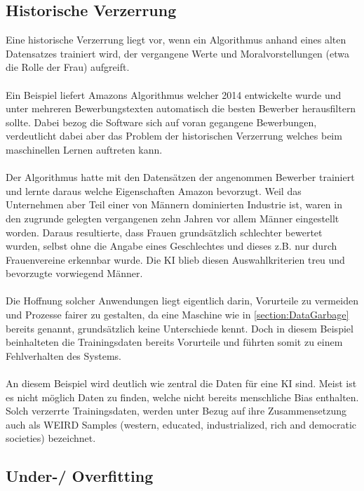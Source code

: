 \documentclass[12pt,oneside,a4paper,parskip]{scrbook}
\begin{document}
\subsection{Historische Verzerrung}
\label{section:biasInTest}
Eine historische Verzerrung liegt vor, wenn ein Algorithmus anhand eines alten Datensatzes trainiert wird, der vergangene Werte und Moralvorstellungen (etwa die Rolle der Frau) aufgreift.%
\\\\
Ein Beispiel liefert Amazons Algorithmus welcher 2014 entwickelte wurde und unter mehreren Bewerbungstexten automatisch die besten Bewerber herausfiltern sollte. Dabei bezog die Software sich auf voran gegangene Bewerbungen, verdeutlicht dabei aber das Problem der historischen Verzerrung welches beim maschinellen Lernen auftreten kann.
\\\\
Der Algorithmus hatte mit den Datensätzen der angenommen Bewerber trainiert und lernte daraus welche Eigenschaften Amazon bevorzugt. Weil das Unternehmen aber Teil einer von Männern dominierten Industrie ist, waren in den zugrunde gelegten vergangenen zehn Jahren vor allem Männer eingestellt worden. Daraus resultierte, dass Frauen grundsätzlich schlechter bewertet wurden, selbst ohne die Angabe eines Geschlechtes und dieses z.B. nur durch Frauenvereine erkennbar wurde. Die KI blieb diesen Auswahlkriterien treu und bevorzugte vorwiegend Männer.\cite{amazon}
\\\\
Die Hoffnung solcher Anwendungen liegt eigentlich darin, Vorurteile zu vermeiden und Prozesse fairer zu gestalten, da eine Maschine wie in \ref{section:DataGarbage} bereits genannt, grundsätzlich keine Unterschiede kennt. Doch in diesem Beispiel beinhalteten die Trainingsdaten bereits Vorurteile und führten somit zu einem Fehlverhalten des Systems.
\\\\
An diesem Beispiel wird deutlich wie zentral die Daten für eine KI sind.
Meist ist es nicht möglich Daten zu finden, welche nicht bereits menschliche Bias enthalten. Solch verzerrte Trainingsdaten, werden unter Bezug auf ihre Zusammensetzung auch als WEIRD Samples (western, educated, industrialized, rich and democratic societies) bezeichnet\cite{BiasInKi}.
\subsection{Under-/ Overfitting}
\label{section:OverUnderfitting}
\end{document}
